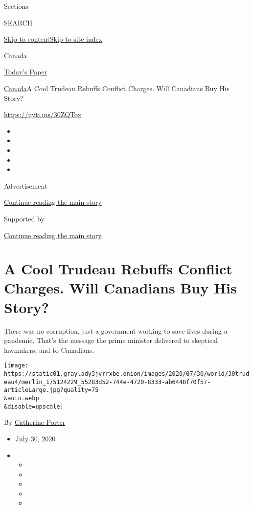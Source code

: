 Sections

SEARCH

\protect\hyperlink{site-content}{Skip to
content}\protect\hyperlink{site-index}{Skip to site index}

\href{https://www.nytimes3xbfgragh.onion/section/world/canada}{Canada}

\href{https://myaccount.nytimes3xbfgragh.onion/auth/login?response_type=cookie\&client_id=vi}{}

\href{https://www.nytimes3xbfgragh.onion/section/todayspaper}{Today's
Paper}

\href{/section/world/canada}{Canada}\textbar{}A Cool Trudeau Rebuffs
Conflict Charges. Will Canadians Buy His Story?

\url{https://nyti.ms/30ZQTox}

\begin{itemize}
\item
\item
\item
\item
\item
\end{itemize}

Advertisement

\protect\hyperlink{after-top}{Continue reading the main story}

Supported by

\protect\hyperlink{after-sponsor}{Continue reading the main story}

\hypertarget{a-cool-trudeau-rebuffs-conflict-charges-will-canadians-buy-his-story}{%
\section{A Cool Trudeau Rebuffs Conflict Charges. Will Canadians Buy His
Story?}\label{a-cool-trudeau-rebuffs-conflict-charges-will-canadians-buy-his-story}}

There was no corruption, just a government working to save lives during
a pandemic. That's the message the prime minister delivered to skeptical
lawmakers, and to Canadians.

\texttt{[image: https://static01.graylady3jvrrxbe.onion/images/2020/07/30/world/30trudeau4/merlin\_175124229\_55283d52-744e-4720-8333-ab6448f70f57-articleLarge.jpg?quality=75\\\&auto=webp\\\&disable=upscale]}

By
\href{https://www.nytimes3xbfgragh.onion/by/catherine-porter}{Catherine
Porter}

\begin{itemize}
\item
  July 30, 2020
\item
  \begin{itemize}
  \item
  \item
  \item
  \item
  \item
  \end{itemize}
\end{itemize}

